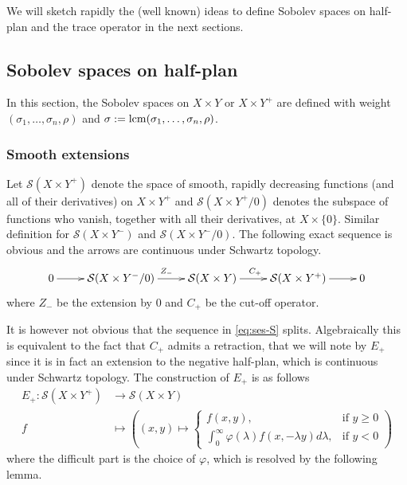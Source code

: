 We will sketch
rapidly the (well known) ideas to define Sobolev spaces on half-plan and the trace
operator in the next sections.

\subsection{Sobolev spaces on half-plan}
\label{sec:org043596f}
In this section, the Sobolev spaces on \(X\times Y\) or \(X\times Y^+\) are defined
with weight \((\sigma_1,\dots,\sigma_n,\rho)\) and \(\sigma:= \mathop{\rm lcm}\nolimits (\sigma_1,\dots,\sigma_n,\rho)\).
\subsubsection{Smooth extensions}
\label{sec:orge91e420}
Let \(\mathcal{S}(X\times Y^+)\) denote the space of
smooth, rapidly decreasing functions (and all of their derivatives) on \(X\times Y^+\)
and  \(\mathcal{S}(X\times Y^+/0)\) denotes the subspace of functions who vanish, together with
all their derivatives, at \(X\times \{0\}\). Similar definition for \(\mathcal{S}(X\times Y^-)\) and
\(\mathcal{S}(X\times Y^-/0)\). The following exact sequence is obvious and the arrows are continuous under Schwartz topology.
\begin{equation}
\label{eq:ses-S}
 \xymatrix{
0 \ar@{->}[r] & \mathcal{S}(X\times Y^-/0) \ar@{->}[r]^{Z_-} & \mathcal{S}(X\times Y) \ar@{->}[r]^{C_+} & \mathcal{S}(X\times Y^+) \ar@{->}[r] & 0
}
\end{equation}
where \(Z_-\) be the extension by \(0\) and \(C_+\) be the cut-off operator. 

It is however not obvious that the sequence in \eqref{eq:ses-S} splits. Algebraically this
is equivalent to the fact that \(C_+\) admits a retraction, that we will note by \(E_+\) since it is
in fact an extension to the negative half-plan, which is continuous
under Schwartz topology. The construction of \(E_+\) is as follows
\begin{align*}
  E_+: \mathcal{S}(X\times Y^+) &\longrightarrow \mathcal{S}(X\times Y) \\
  	f 		     	  &\longmapsto	  \left( (x,y) \longmapsto \begin{cases}
								       f(x,y),  & \text{if $y\geq 0$} \\
								       \int_0^\infty \varphi(\lambda) f(x,-\lambda y) d\lambda, & \text{if $y<0$}
								       \end{cases} \right)
\end{align*}
where the difficult part is the choice of \(\varphi\), which is resolved by
the following lemma.

